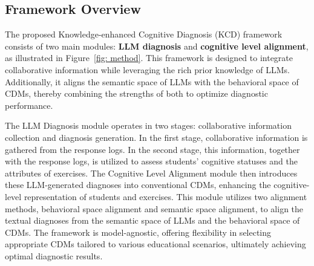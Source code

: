 \subsection{Framework Overview}

The proposed Knowledge-enhanced Cognitive Diagnosis (KCD) framework consists of two main modules: \textbf{LLM diagnosis} and \textbf{cognitive level alignment}, as illustrated in Figure~\ref{fig: method}.
This framework is designed to integrate collaborative information while leveraging the rich prior knowledge of LLMs.
Additionally, it aligns the semantic space of LLMs with the behavioral space of CDMs, thereby combining the strengths of both to optimize diagnostic performance.


The LLM Diagnosis module operates in two stages: collaborative information collection and diagnosis generation. In the first stage, collaborative information is gathered from the response logs. In the second stage, this information, together with the response logs, is utilized to assess students' cognitive statuses and the attributes of exercises. 
The Cognitive Level Alignment module then introduces these LLM-generated diagnoses into conventional CDMs, enhancing the cognitive-level representation of students and exercises. 
This module utilizes two alignment methods, behavioral space alignment and semantic space alignment, to align the textual diagnoses from the semantic space of LLMs and the behavioral space of CDMs.
The framework is model-agnostic, offering flexibility in selecting appropriate CDMs tailored to various educational scenarios, ultimately achieving optimal diagnostic results.

